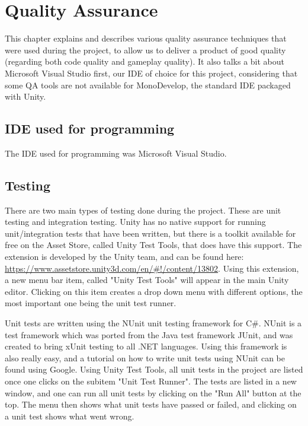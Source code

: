 \chapter{Quality Assurance} \label{cha:qa}
	This chapter explains and describes various quality assurance techniques 
	that were used during the project, to allow us to deliver a product of 
	good quality (regarding both code quality and gameplay quality). It also
	talks a bit about Microsoft Visual Studio first, our IDE of choice for
	this project, considering that some QA tools are not available for
	MonoDevelop, the standard IDE packaged with Unity.
	\section{IDE used for programming} \label{sec:ide}
	The IDE used for programming was Microsoft Visual Studio.
	
	\section{Testing} \label{sec:testing}
	There are two main types of testing done during the project. These are
	unit testing and integration testing. Unity has no native support for
	running unit/integration tests that have been written, but there is a toolkit
	available for free on the Asset Store, called Unity Test Tools, that does
	have this support. The extension is developed by the Unity team, and can be 
	found here: \url{https://www.assetstore.unity3d.com/en/#!/content/13802}.
	Using this extension, a new menu bar item, called "Unity Test Tools"
	will appear in the main Unity editor. Clicking on this item creates a drop
	down menu with different options, the most important one being the unit test
	runner.
	
	Unit tests are written using the NUnit unit testing framework for C\#. NUnit
	is a test framework which was ported from the Java test framework JUnit, and
	was created to bring xUnit testing to all .NET languages. Using this framework
	is also really easy, and a tutorial on how to write unit tests using NUnit
	can be found using Google. Using Unity Test Tools, all unit tests in the
	project are listed once one clicks on the subitem "Unit Test Runner".
	The tests are listed in a new window, and one can run all unit tests by
	clicking on the "Run All" button at the top. The menu then shows what unit tests
	have passed or failed, and clicking on a unit test shows what went wrong.
	

